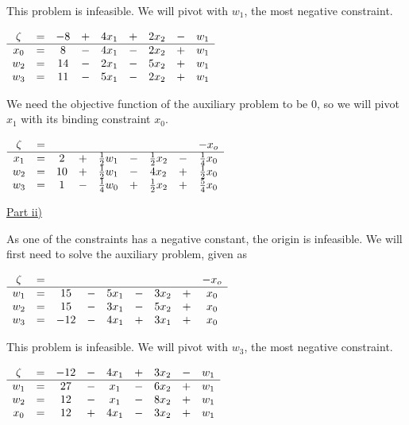 \documentclass[letterpaper,12pt]{article}
\begin{document}
This problem is infeasible. We will pivot with $w_1$, the most negative constraint.
\begin{center}
	$\begin{array}{ c c c c c c c c c c }
	\zeta & = & -8 &  + & 4x_1 & + & 2x_2 & - & w_1 \\
	\hline
	x_0 & = & 8 & - & 4x_1 & - & 2x_2 & + & w_1 \\
	w_2 & = & 14  & - & 2x_1 & - & 5x_2 & + & w_1 \\
	w_3 & = & 11  & - & 5x_1  & -  &  2x_2 & + & w_1 \\
	\end{array}$ \\
\end{center}

We need the objective function of the auxiliary problem to be 0, so we will pivot $x_1$ with its binding constraint $x_0$.
\begin{center}
	$\begin{array}{ c c c c c c c c c c }
	\zeta & = &  &   &      &   &      &   & -x_o \\
	\hline
	x_1 & = & 2 & + & \frac{1}{2}w_1 & - & \frac{1}{2}x_2 & - & \frac{1}{4}x_0 \\
	w_2 & = & 10  & + & \frac{1}{2}w_1 & - & 4x_2 & + & \frac{1}{2}x_0 \\
	w_3 & = & 1  & - & \frac{1}{4}w_0  & +  &  \frac{1}{2}x_2 & + & \frac{5}{4}x_0 \\
	\end{array}$ \\
\end{center}

\underline{Part ii)}

As one of the constraints has a negative constant, the origin is infeasible. We will first need to solve the auxiliary problem, given as
\begin{center}
	$\begin{array}{ c c c c c c c c c c }
	\zeta & = &  &   &      &   &      &   & -x_o \\
	\hline
	w_1 & = & 15 & - & 5x_1 & - & 3x_2 & + & x_0 \\
	w_2 & = & 15  & - & 3x_1 & - & 5x_2 & + & x_0 \\
	w_3 & = & -12  & - & 4x_1  & + &  3x_1 & + & x_0 \\
	\end{array}$ \\
\end{center}

This problem is infeasible. We will pivot with $w_3$, the most negative constraint.
\begin{center}
	$\begin{array}{ c c c c c c c c c c }
	\zeta & = & -12 & - & 4x_1 & + & 3x_2 & - & w_1 \\
	\hline
	w_1 & = & 27 & - & x_1 & - & 6x_2 & + & w_1 \\
	w_2 & = & 12  & - & x_1 & - & 8x_2 & + & w_1 \\
	x_0 & = & 12  & + & 4x_1  & -  &  3x_2 & + & w_1 \\
	\end{array}$ \\
\end{center}
\end{document}

